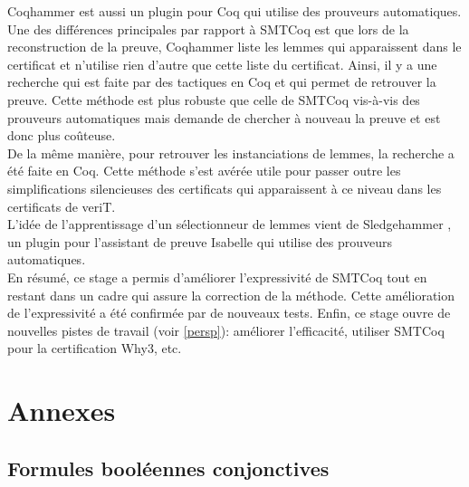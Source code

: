 \documentclass[11pt]{article}
\begin{document}
Coqhammer \cite{coqhammer} est aussi un plugin pour Coq qui utilise des prouveurs automatiques. Une des différences principales par rapport à SMTCoq est que lors de la reconstruction de la preuve, Coqhammer liste les lemmes qui apparaissent dans le certificat et n'utilise rien d'autre que cette liste du certificat. Ainsi, il y a une recherche qui est faite par des tactiques en Coq et qui permet de retrouver la preuve. Cette méthode est plus robuste que celle  de SMTCoq vis-à-vis des prouveurs automatiques mais demande de chercher à nouveau la preuve et est donc plus coûteuse. \\
De la même manière, pour retrouver les instanciations de lemmes, la recherche a été faite en Coq. Cette méthode s'est avérée utile pour passer outre les simplifications silencieuses des certificats qui apparaissent à ce niveau dans les certificats de veriT. \\
L'idée de l'apprentissage d'un sélectionneur de lemmes vient de Sledgehammer \cite{sledgehammer_manual}, un plugin pour l'assistant de preuve Isabelle qui utilise des prouveurs automatiques. \\

En résumé, ce stage a permis d'améliorer l'expressivité de SMTCoq tout en restant dans un cadre qui assure la correction de la méthode. Cette amélioration de l'expressivité a été confirmée par de nouveaux tests. Enfin, ce stage ouvre de nouvelles pistes de travail (voir \ref{persp}): améliorer l'efficacité, utiliser SMTCoq pour la certification Why3, etc.



\renewcommand\refname{Bibliographie}
\nocite{*}
{}


\newpage
\pagestyle{empty}

\section{Annexes}
\subsection{Formules booléennes conjonctives} \label{annexe_peigne}
\end{document}
